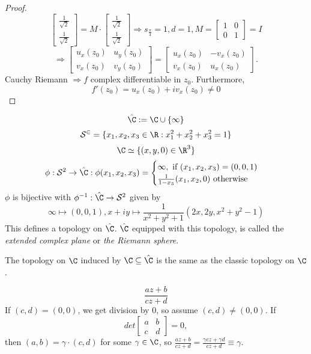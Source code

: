 \begin{proof}
$$\begin{bmatrix}
  \frac{1}{\sqrt{2}} \\
  \frac{1}{\sqrt{2}}
\end{bmatrix}
=M \cdot
\begin{bmatrix}
  \frac{1}{\sqrt{2}} \\
  \frac{1}{\sqrt{2}}
\end{bmatrix}
\Rightarrow s_{\frac{\pi}{4}}=1, d=1,
M=
\begin{bmatrix}
  1 & 0 \\
  0 & 1
\end{bmatrix}
=I
$$
$$
\Rightarrow
\begin{bmatrix}
  u_x(z_0) & u_y(z_0) \\
  v_x(z_0) & v_y(z_0)
\end{bmatrix}
=
\begin{bmatrix}
  u_x(z_0) & -v_x(z_0) \\
  v_x(z_0) & u_x(z_0)
\end{bmatrix}.
$$
Cauchy Riemann
\newline $\Rightarrow f$ complex differentiable in $z_0$. Furthermore, $$f'(z_0)=u_x(z_0)+iv_x(z_0)\neq 0$$
\end{proof}

$$\hat{\C}:=\C\cup\{\infty\}$$
$$\mathcal{S^2}=\{x_1,x_2,x_3\in \R: x_1^2+x_2^2+x_3^2=1\}$$
$$\C\simeq \{(x,y,0)\in \R^3\}$$
$$\phi: \mathcal{S}^2\to \hat{\C}: \phi(x_1,x_2,x_3)=
\begin{cases}
  \infty , \text{ if }(x_1,x_2,x_3)=(0,0,1) \\
  \frac{1}{1-x_3}(x_1,x_2,0) \text{ otherwise}
\end{cases}
$$
$\phi$ is bijective with $\phi^{-1}: \hat{\C}\to \mathcal{S}^2$ given by
$$\infty \mapsto (0,0,1), x+iy\mapsto \frac{1}{x^2+y^2+1}(2x,2y,x^2+y^2-1)$$
This defines a topology on $\hat{\C}$. $\hat{\C}$ equipped with this topology, is called the \emph{extended complex plane} or \emph{the Riemann sphere}.
\begin{remark}
  The topology on $\C$ induced by $\C\subseteq \hat{\C}$ is the same as the classic topology on $\C$.
\end{remark}
$$\frac{az+b}{cz+d}$$
If $(c,d)=(0,0)$, we get division by $0$, so assume $(c,d)\neq (0,0)$. If
$$
det
\begin{bmatrix}
  a & b \\
  c & d
\end{bmatrix}
=0,
$$
 then $(a,b)=\gamma \cdot(c,d)$ for some $\gamma \in \C$, so $\frac{az+b}{cz+d}=\frac{\gamma cz+\gamma d}{cz+d}\equiv \gamma$.

